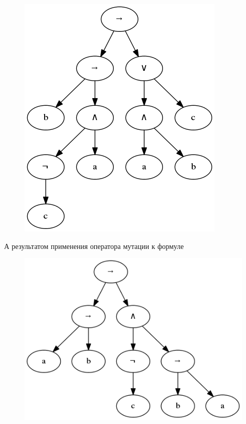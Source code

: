 \documentclass[12pt,fleqn]{article}
\begin{document}
\begin{figure}[!h]
  \centering
    \includegraphics[scale=0.45]{t5.png}
\end{figure}

\FloatBarrier

А результатом применения оператора мутации к формуле

\FloatBarrier

\begin{figure}[!h]
  \centering
    \includegraphics[scale=0.45]{t6.png}
\end{figure}

\FloatBarrier
\end{document}
